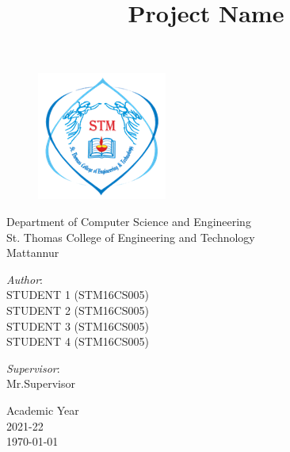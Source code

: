 \documentclass[svgnames,9pt]{beamer}
\title[Short title]{\huge \textbf{Project Name}  } %
\author[Group1]{}
\date{}
\begin{document}
	\begin{frame}
		
		\begin{figure}[h!]
			\includegraphics[scale=0.5]{img/stthomaskannur.png}
		\end{figure}
		
		\begin{center}      
			\begin{minipage}[b]{1.0\textwidth}
				\centering
				Department of Computer Science and Engineering\\
				St. Thomas College of Engineering and Technology\\Mattannur
			\end{minipage}%
		\end{center}
		
		\titlepage
		
		\begin{minipage}[t]{0.5\textwidth}
			\vspace{-2cm}
			\begin{flushleft}
				{ \textit{Author}:\vspace*{0.1cm} \\STUDENT 1 (STM16CS005)\\STUDENT 2 (STM16CS005)\\STUDENT 3 (STM16CS005)\\STUDENT 4 (STM16CS005) } %
			\end{flushleft}
		\end{minipage}%
		\begin{minipage}[t]{0.5\textwidth}
			\vspace{-2cm}
			\begin{flushright}
				{\textit{Supervisor}:\vspace*{0.1cm} \\ Mr.Supervisor} %
			\end{flushright}    
		\end{minipage}%
		
		\vspace{-0.7cm}
		\begin{center}      
			\begin{minipage}[b]{0.5\textwidth}
				\centering  
				\small Academic Year \\ 2021-22\\ \today
			\end{minipage}%
		\end{center}    
	\end{frame}
\end{document}
